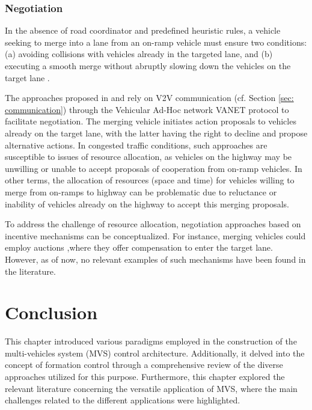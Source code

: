 \subsubsection{Negotiation} \label{sec: merging_negotiation}
In the absence of road coordinator and predefined heuristic rules, a vehicle seeking to merge into a lane from an on-ramp vehicle must ensure two conditions: (a) avoiding collisions with vehicles already in the targeted lane, and (b) executing a smooth merge without abruptly slowing down the vehicles on the target lane \cite{mariani2021coordination}. 

The approaches proposed in \cite{amoozadeh2015platoon} and \cite{aoki2017merging} rely on V2V communication (cf. Section \ref{sec: communication}) through the Vehicular Ad-Hoc network VANET protocol to facilitate negotiation. The merging vehicle initiates action proposals to vehicles already on the target lane, with the latter having the right to decline and propose alternative actions. In congested traffic conditions, such approaches are susceptible to issues of resource allocation, as vehicles on the highway may be unwilling or unable to accept proposals of cooperation from on-ramp vehicles. In other terms, the allocation of resources (space and time) for vehicles willing to merge from on-ramps to highway can be problematic due to reluctance or inability of vehicles already on the highway to accept this merging proposals. 

To address the challenge of resource allocation, negotiation approaches based on incentive mechanisms can be conceptualized. For instance, merging vehicles could employ auctions \cite{adhau2012multi}\cite{adnan2016protocols}\cite{cui2013game},where they offer compensation to enter the target lane. However, as of now, no relevant examples of such mechanisms have been found in the literature.


\section{Conclusion}


This chapter introduced various paradigms employed in the construction of the multi-vehicles system (MVS) control architecture. Additionally, it delved into the concept of formation control through a comprehensive review of the diverse approaches utilized for this purpose. Furthermore, this chapter explored the relevant literature concerning the versatile application of MVS, where the main challenges related to the different applications were highlighted. 

